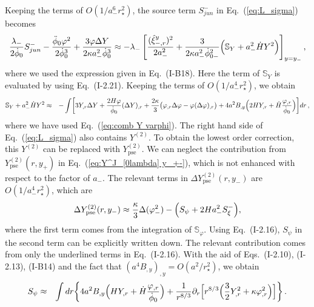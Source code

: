 \documentclass[a4paper,showpacs,preprintnumbers,amsmath,amssymb]{revtex4}
\begin{document}
Keeping the terms of $O(1/a_-^6 r^2_\star)$, the source term $S^{-}_{jun}$ in Eq.~(\ref{eq:L_sigma}) becomes
\begin{eqnarray}
  \frac{ \lambda_{-}}{2\dot\phi_0} S^{-}_{jun} 
  - \frac{ \ddot\phi_0  \varphi^2}{2 \dot\phi_0^3} 
  + \frac{3 \varphi  \Delta  Y }
      {2\kappa a^2_- \dot\phi_0^3}
\approx 
  -\lambda_- 
\left[
   \frac{(\hat\xi^y_{-,r})^2}{2a_-^2}
+  \frac{3}{2\kappa a_-^2 \dot\phi_{0-}^2 }
\Bigl(  {\mathbb S}_Y  + a_-^2 \dot H  Y^2\Bigr)
\right]_{y=y_-} , 
\label{eq:Sjun terms}
\end{eqnarray}
where we used the expression given in Eq.~(I-B18). 
Here the term of ${\mathbb S}_Y$ is evaluated by using Eq.~(I-2.21). Keeping the terms of $O(1/a_-^4 r_\star^2)$, we obtain
\begin{eqnarray}
{\mathbb S}_Y  + a_-^2 \dot H  Y^2
&\approx&
 - \int \biggl[
  3 Y_{,r} \Delta Y  
 + \frac{2H\varphi}{\dot \phi_0} (\Delta Y)_{,r} 
 + \frac{2 \kappa}{3} 
    \bigl(
       \varphi_{,r} \Delta \varphi 
       - \varphi (\Delta \varphi)_{,r} 
    \bigr)
  +4 a^2 B_{,y} 
  \Bigl( 2 H Y_{,r}+ \dot H \frac{\varphi_{,r}}{\dot\phi_0}  \Bigr) 
      \biggr]  dr \,,
\end{eqnarray}
where we have used Eq.~(\ref{eq:comb Y varphi}).
The right hand side of Eq.~(\ref{eq:L_sigma})  also contains $Y^{(2)}$. 
To obtain the lowest order correction, this $Y^{(2)}$ can be replaced with $Y_{ \mathrm{pse} }^{(2)}$. 
We can neglect the contribution from 
$Y_{ \mathrm{pse} }^{(2)}(r,y_{+})$ in Eq.~(\ref{eq:Y^J_[0lambda] y_+-}), which is not enhanced with respect to the factor of $a_-$. 
The relevant terms in $\Delta Y_{ \mathrm{pse} }^{(2)}(r, y_{-})$ are $O(1/a_-^4 r_\star^2)$, which are 
\begin{eqnarray}
 \Delta Y^{(2)}_{ \mathrm{pse}} (r, y_{-})
 \approx 
    \frac{\kappa}{3} \Delta ( \varphi^2_- )
 -  \Bigl( S_\psi + 2H a_{-}^2 S_{\xi}^{-} \Bigr), 
\label{eq:Y^2 terms}
\end{eqnarray}
where the first term comes from the integration of ${\mathbb
S}_\varphi$.  
Using Eq.~(I-2.16), $S_\psi$ in the second term can be explicitly written down. 
The relevant contribution comes from only the underlined terms in Eq.~(I-2.16). 
With the aid of Eqs.~(I-2.10),  (I-2.13), (I-B14) and the fact that $(a^4 B_{,y})_{,y}=O(a^2/r_\star^2)$, we obtain 
\begin{eqnarray}
 S_\psi 
&\approx&
  \int dr 
  \biggl\{
    4a^2 B_{,y} \Bigl(HY_{,r} +\dot H  \frac{\varphi_{,r}}{\dot \phi_0}\Bigr)
  + \frac{1}{ r^{8/3}} \partial_r
 \Bigl[ r^{8/3} 
  \Bigl( \frac{3}{2} Y_{,r}^2 + \kappa \varphi_{,r}^2 
  \Bigr)
  \Bigr] 
 \biggr\}  \,. 
\end{eqnarray}
\end{document}
